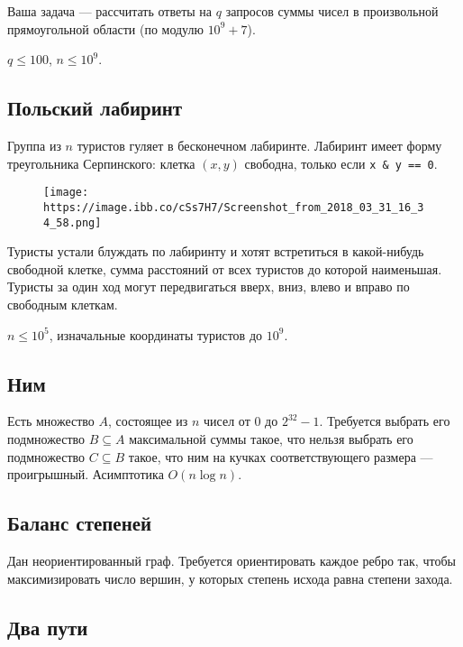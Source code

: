 \documentclass[11pt]{article}
\makeatletter
\def\maxwidth{\ifdim\Gin@nat@width>\linewidth\linewidth
    \else\Gin@nat@width\fi}
\let\Oldincludegraphics\includegraphics
\renewcommand{\includegraphics}[1]{\Oldincludegraphics[width=.8\maxwidth]{#1}}
\makeatother
\begin{document}
    Ваша задача --- рассчитать ответы на \(q\) запросов суммы чисел в
произвольной прямоугольной области (по модулю \(10^9+7\)).

\(q \leq 100\), \(n \leq 10^9\).

    \subsection{Польский
лабиринт}\label{ux43fux43eux43bux44cux441ux43aux438ux439-ux43bux430ux431ux438ux440ux438ux43dux442}

Группа из \(n\) туристов гуляет в бесконечном лабиринте. Лабиринт имеет
форму треугольника Серпинского: клетка \((x, y)\) свободна, только если
\texttt{x\ \&\ y\ ==\ 0}.

\begin{figure}
\centering
\texttt{[image: https://image.ibb.co/cSs7H7/Screenshot\_from\_2018\_03\_31\_16\_34\_58.png]}
\caption{}
\end{figure}

Туристы устали блуждать по лабиринту и хотят встретиться в какой-нибудь
свободной клетке, сумма расстояний от всех туристов до которой
наименьшая. Туристы за один ход могут передвигаться вверх, вниз, влево и
вправо по свободным клеткам.

\(n \leq 10^5\), изначальные координаты туристов до \(10^9\).

    \subsection{Ним}\label{ux43dux438ux43c}

Есть множество \(A\), состоящее из \(n\) чисел от 0 до \(2^{32}-1\).
Требуется выбрать его подмножество \(B \subseteq A\) максимальной суммы
такое, что нельзя выбрать его подмножество \(C \subseteq B\) такое, что
ним на кучках соответствующего размера --- проигрышный. Асимптотика
\(O(n \log n)\).

    \subsection{Баланс
степеней}\label{ux431ux430ux43bux430ux43dux441-ux441ux442ux435ux43fux435ux43dux435ux439}

Дан неориентированный граф. Требуется ориентировать каждое ребро так,
чтобы максимизировать число вершин, у которых степень исхода равна
степени захода.

    \subsection{Два пути}\label{ux434ux432ux430-ux43fux443ux442ux438}
\end{document}
